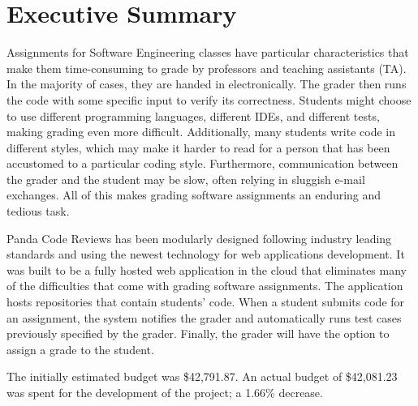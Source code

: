 \part*{Executive Summary}

Assignments for Software Engineering classes have particular characteristics
that make them time-consuming to grade by professors and teaching assistants
(TA). In the majority of cases, they are handed in electronically. The grader
then runs the code with some specific input to verify its correctness. Students
might choose to use different programming languages, different IDEs, and
different tests, making grading even more difficult. Additionally, many students
write code in different styles, which may make it harder to read for a person
that has been accustomed to a particular coding style. Furthermore,
communication between the grader and the student may be slow, often relying in
sluggish e-mail exchanges. All of this makes grading software assignments an
enduring and tedious task.

Panda Code Reviews has been modularly designed following industry leading
standards and using the newest technology for web applications development. It
was built to be a fully hosted web application in the cloud that
eliminates many of the difficulties that come with grading software assignments.
The application hosts repositories that contain students' code. When a
student submits code for an assignment, the system notifies the grader and
automatically runs test cases previously specified by the grader.
Finally, the grader will have the option to assign a
grade to the student.

The initially estimated budget was \$42,791.87. An actual budget of \$42,081.23 was spent for the development of the project; a 1.66\% decrease.

